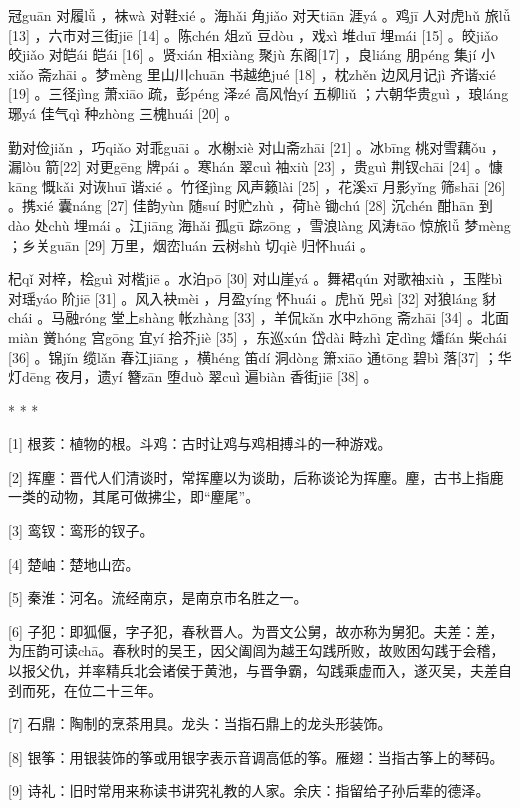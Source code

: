 \documentclass[12pt,UTF8]{ctexbook}
\begin{document}
冠guān 对履lǚ ，袜wà 对鞋xié 。海hǎi 角jiǎo 对天tiān 涯yá 。鸡jī 人对虎hǔ 旅lǚ [13] ，六市对三街jiē [14] 。陈chén 俎zǔ 豆dòu ，戏xì 堆duī 埋mái [15] 。皎jiǎo 皎jiǎo 对皑ái 皑ái [16] 。贤xián 相xiàng 聚jù 东阁[17] ，良liáng 朋péng 集jí 小xiǎo 斋zhāi 。梦mèng 里山川chuān 书越绝jué [18] ，枕zhěn 边风月记jì 齐谐xié [19] 。三径jìng 萧xiāo 疏，彭péng 泽zé 高风怡yí 五柳liǔ ；六朝华贵guì ，琅láng 琊yá 佳气qì 种zhòng 三槐huái [20] 。

勤对俭jiǎn ，巧qiǎo 对乖guāi 。水榭xiè 对山斋zhāi [21] 。冰bīng 桃对雪藕ǒu ，漏lòu 箭[22] 对更gēng 牌pái 。寒hán 翠cuì 袖xiù [23] ，贵guì 荆钗chāi [24] 。慷kāng 慨kǎi 对诙huī 谐xié 。竹径jìng 风声籁lài [25] ，花溪xī 月影yǐng 筛shāi [26] 。携xié 囊náng [27] 佳韵yùn 随suí 时贮zhù ，荷hè 锄chú [28] 沉chén 酣hān 到dào 处chù 埋mái 。江jiāng 海hǎi 孤gū 踪zōng ，雪浪làng 风涛tāo 惊旅lǚ 梦mèng ；乡关guān [29] 万里，烟峦luán 云树shù 切qiè 归怀huái 。

杞qǐ 对梓，桧guì 对楷jiē 。水泊pō [30] 对山崖yá 。舞裙qún 对歌袖xiù ，玉陛bì 对瑶yáo 阶jiē [31] 。风入袂mèi ，月盈yíng 怀huái 。虎hǔ 兕sì [32] 对狼láng 豺chái 。马融róng 堂上shàng 帐zhàng [33] ，羊侃kǎn 水中zhōng 斋zhāi [34] 。北面miàn 黉hóng 宫gōng 宜yí 拾芥jiè [35] ，东巡xún 岱dài 畤zhì 定dìng 燔fán 柴chái [36] 。锦jǐn 缆lǎn 春江jiāng ，横héng 笛dí 洞dòng 箫xiāo 通tōng 碧bì 落[37] ；华灯dēng 夜月，遗yí 簪zān 堕duò 翠cuì 遍biàn 香街jiē [38] 。



* * *



[1] 根荄：植物的根。斗鸡：古时让鸡与鸡相搏斗的一种游戏。

[2] 挥麈：晋代人们清谈时，常挥麈以为谈助，后称谈论为挥麈。麈，古书上指鹿一类的动物，其尾可做拂尘，即“麈尾”。

[3] 鸾钗：鸾形的钗子。

[4] 楚岫：楚地山峦。

[5] 秦淮：河名。流经南京，是南京市名胜之一。

[6] 子犯：即狐偃，字子犯，春秋晋人。为晋文公舅，故亦称为舅犯。夫差：差，为压韵可读chā。春秋时的吴王，因父阖闾为越王勾践所败，故败困勾践于会稽，以报父仇，并率精兵北会诸侯于黄池，与晋争霸，勾践乘虚而入，遂灭吴，夫差自刭而死，在位二十三年。

[7] 石鼎：陶制的烹茶用具。龙头：当指石鼎上的龙头形装饰。

[8] 银筝：用银装饰的筝或用银字表示音调高低的筝。雁翅：当指古筝上的琴码。

[9] 诗礼：旧时常用来称读书讲究礼教的人家。余庆：指留给子孙后辈的德泽。
\end{document}
